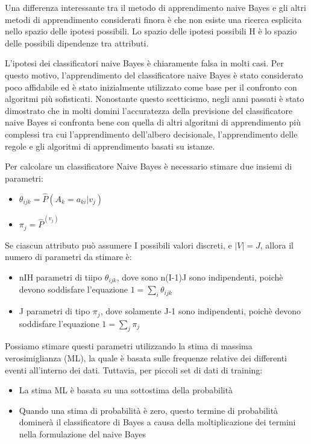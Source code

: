 \documentclass[a4paper]{extarticle}
\begin{document}
Una differenza interessante tra il metodo di apprendimento naive Bayes e gli altri metodi di apprendimento considerati finora è che non esiste una ricerca esplicita nello spazio delle ipotesi possibili. Lo spazio delle ipotesi possibili H è lo spazio delle possibili dipendenze tra attributi. 

L’ipotesi dei classificatori naive Bayes è chiaramente falsa in molti casi. Per questo motivo, l'apprendimento del classificatore naive Bayes è stato considerato poco affidabile ed è stato inizialmente utilizzato come base per il confronto con algoritmi più sofisticati. Nonostante questo scetticismo, negli anni passati è stato dimostrato che in molti domini l’accuratezza della previsione del classificatore naive Bayes si confronta bene con quella di altri algoritmi di apprendimento più complessi tra cui l’apprendimento dell’albero decisionale, l’apprendimento delle regole e gli algoritmi di apprendimento basati su istanze.

Per calcolare un classificatore Naive Bayes è necessario stimare due insiemi di parametri:
\begin{itemize}
\item $\theta_{ijk} = \hat P (A_k = a_{ki} | v_j)$
\item $\pi_j = \hat P ^(v_j)$
\end{itemize}

Se ciascun attributo può assumere I possibili valori discreti, e $|V| = J$, allora il numero di parametri da stimare è:

\begin{itemize}
\item nIH parametri di tiipo $\theta_{ijk}$, dove sono n(I-1)J sono indipendenti, poichè devono soddisfare l'equazione $1=\sum\limits_i \theta_{ijk}$
\item J parametri di tipo $\pi_j $, dove solamente J-1 sono indipendenti, poichè devono soddisfare l'equazione $1=\sum\limits_j \pi_j $
\end{itemize}

Possiamo stimare questi parametri utilizzando la stima di massima verosimiglianza (ML), la quale è basata sulle frequenze relative dei differenti eventi all'interno dei dati. Tuttavia, per piccoli set di dati di training:

\begin{itemize}
\item La stima ML è basata su una sottostima della probabilità
\item Quando una stima di probabilità è zero, questo termine di probabilità dominerà il classificatore di Bayes a causa della moltiplicazione dei termini nella formulazione del naive Bayes
\end{itemize}
\end{document}
